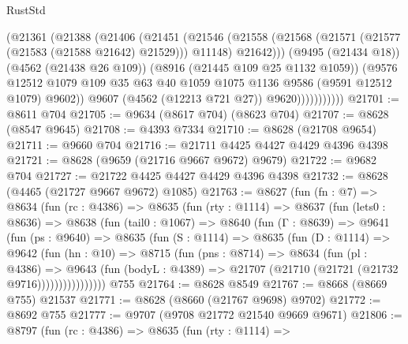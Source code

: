 \begin{lexlean}{RustStd}
\begin{coremodule}
                      (@21361
                        (@21388
                          (@21406
                            (@21451
                              (@21546
                                (@21558
                                  (@21568 (@21571 (@21577 (@21583 (@21588 @21642) @21529))) @11148)
                                  @21642)))
                            (@9495 (@21434 @18))
                            (@4562 (@21438 @26 @109))
                            (@8916 (@21445 @109 @25 @1132 @1059))
                            (@9576
                              @12512
                              @1079
                              @109
                              @35
                              @63
                              @40
                              @1059
                              @1075
                              @1136
                              @9586
                              (@9591 @12512 @1079)
                              @9602))
                          @9607
                          (@4562 (@12213 @721 @27))
                          @9620)))))))))))
@21701 := @8611 @704
@21705 := @9634 (@8617 @704) (@8623 @704)
@21707 := @8628 (@8547 @9645)
@21708 := @4393 @7334
@21710 := @8628 (@21708 @9654)
@21711 := @9660 @704
@21716 := @21711 @4425 @4427 @4429 @4396 @4398
@21721 := @8628 (@9659 (@21716 @9667 @9672) @9679)
@21722 := @9682 @704
@21727 := @21722 @4425 @4427 @4429 @4396 @4398
@21732 := @8628 (@4465 (@21727 @9667 @9672) @1085)
@21763 := @8627
    (fun (fn : @7) =>
    @8634
      (fun (rc : @4386) =>
      @8635
        (fun (rty : @1114) =>
        @8637
          (fun (lets0 : @8636) =>
          @8638
            (fun (tail0 : @1067) =>
            @8640
              (fun (Γ : @8639) =>
              @9641
                (fun (ps : @9640) =>
                @8635
                  (fun (S : @1114) =>
                  @8635
                    (fun (D : @1114) =>
                    @9642
                      (fun (hn : @10) =>
                      @8715
                        (fun (pns : @8714) =>
                        @8634
                          (fun (pl : @4386) =>
                          @9643
                            (fun (bodyL : @4389) =>
                            @21707 (@21710 (@21721 (@21732 @9716))))))))))))))))
    @755
@21764 := @8628 @8549
@21767 := @8668 (@8669 @755) @21537
@21771 := @8628 (@8660 (@21767 @9698) @9702)
@21772 := @8692 @755
@21777 := @9707 (@9708 @21772 @21540 @9669 @9671)
@21806 := @8797
    (fun (rc : @4386) =>
    @8635
      (fun (rty : @1114) =>

\end{coremodule}
\end{lexlean}
